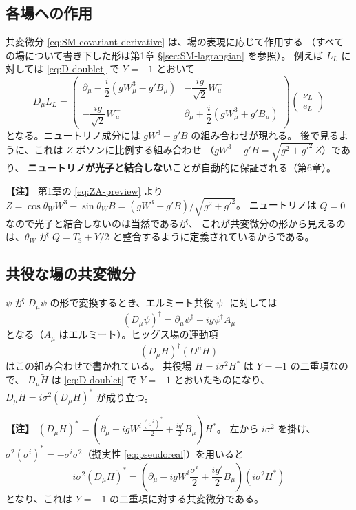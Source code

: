 \documentclass[uplatex,dvipdfmx,a4paper,11pt,openany]{jsbook}
\newenvironment{note}{\vspace{1ex}\par\footnotesize\noindent\textbf{【注】}}{\par\vspace{1ex}}
\numberwithin{equation}{chapter}
\theoremstyle{definition}
\theoremstyle{plain}
\theoremstyle{remark}
\begin{document}
\subsection{各場への作用}
共変微分 \eqref{eq:SM-covariant-derivative} は、場の表現に応じて作用する
（すべての場について書き下した形は第1章 \S\ref{sec:SM-lagrangian} を参照）。
例えば $L_L$ に対しては \eqref{eq:D-doublet} で $Y=-1$ とおいて
\begin{equation}
D_\mu L_L=
\begin{pmatrix}
\partial_\mu-\dfrac{i}{2}\left(gW_\mu^3-g'B_\mu\right) & -\dfrac{ig}{\sqrt2}W_\mu^+\\[2mm]
-\dfrac{ig}{\sqrt2}W_\mu^- & \partial_\mu+\dfrac{i}{2}\left(gW_\mu^3+g'B_\mu\right)
\end{pmatrix}
\begin{pmatrix}\nu_L\\ e_L\end{pmatrix}
\end{equation}
となる。ニュートリノ成分には $gW^3-g'B$ の組み合わせが現れる。
後で見るように、これは $Z$ ボソンに比例する組み合わせ
（$gW^3-g'B=\sqrt{g^2+g'^2}\,Z$）であり、
\textbf{ニュートリノが光子と結合しない}ことが自動的に保証される（第6章）。
\begin{note}
第1章の \eqref{eq:ZA-preview} より
$Z=\cos\theta_WW^3-\sin\theta_WB=(gW^3-g'B)/\sqrt{g^2+g'^2}$。
ニュートリノは $Q=0$ なので光子と結合しないのは当然であるが、
これが共変微分の形から見えるのは、$\theta_W$ が $Q=T_3+Y/2$ と整合するように定義されているからである。
\end{note}
\subsection{共役な場の共変微分}
$\psi$ が $D_\mu\psi$ の形で変換するとき、エルミート共役 $\psi^\dagger$ に対しては
\begin{equation}
(D_\mu\psi)^\dagger=\partial_\mu\psi^\dagger+ig\psi^\dagger A_\mu
\end{equation}
となる（$A_\mu$ はエルミート）。ヒッグス場の運動項
\begin{equation}
(D_\mu H)^\dagger(D^\mu H)
\end{equation}
はこの組み合わせで書かれている。
共役場 $\tilde H=i\sigma^2H^*$ は $Y=-1$ の二重項なので、
$D_\mu\tilde H$ は \eqref{eq:D-doublet} で $Y=-1$ とおいたものになり、
$D_\mu\tilde H=i\sigma^2(D_\mu H)^*$ が成り立つ。
\begin{note}
$(D_\mu H)^*=\left(\partial_\mu+igW^i\frac{(\sigma^i)^*}{2}+\frac{ig'}{2}B_\mu\right)H^*$。
左から $i\sigma^2$ を掛け、$\sigma^2(\sigma^i)^*=-\sigma^i\sigma^2$（擬実性 \eqref{eq:pseudoreal}）を用いると
\[
i\sigma^2(D_\mu H)^*
=\left(\partial_\mu-igW^i\frac{\sigma^i}{2}+\frac{ig'}{2}B_\mu\right)(i\sigma^2H^*)
\]
となり、これは $Y=-1$ の二重項に対する共変微分である。
\end{note}
\end{document}
